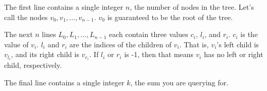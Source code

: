 The first line contains a single integer $n$, the number of nodes in the tree. Let's call the nodes $v_0, v_1, \dots, v_{n-1}$. $v_0$ is guaranteed to be the root of the tree.

The next $n$ lines $L_0, L_1, \dots, L_{n-1}$ each contain three values $c_i$, $l_i$, and $r_i$. $c_i$ is the value of $v_i$. $l_i$ and $r_i$ are the indices of the children of $v_i$. That is, $v_i$'s left child is $v_{l_i}$, and its right child is $v_{r_i}$. If $l_i$ or $r_i$ is -1, then that means $v_i$ has no left or right child, respectively.

The final line contains a single integer $k$, the sum you are querying for.